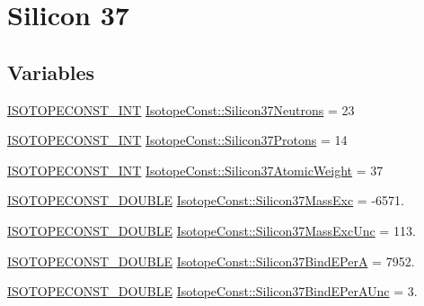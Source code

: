 \hypertarget{group___isotope_const-_silicon-_si37}{}\section{Silicon 37}
\label{group___isotope_const-_silicon-_si37}
\subsection*{Variables}
\begin{DoxyCompactItemize}
\item 
\mbox{\hyperlink{group___isotope_const-_macros_ga5f18360b3e99483a35c32d789e62621c}{I\+S\+O\+T\+O\+P\+E\+C\+O\+N\+S\+T\+\_\+\+I\+NT}} \mbox{\hyperlink{group___isotope_const-_silicon-_si37_gae384b92e5328dbd0e4b34cd60500f507}{Isotope\+Const\+::\+Silicon37\+Neutrons}} = 23
\item 
\mbox{\hyperlink{group___isotope_const-_macros_ga5f18360b3e99483a35c32d789e62621c}{I\+S\+O\+T\+O\+P\+E\+C\+O\+N\+S\+T\+\_\+\+I\+NT}} \mbox{\hyperlink{group___isotope_const-_silicon-_si37_ga2416bdca2fa3dddcbc864745a2773ec3}{Isotope\+Const\+::\+Silicon37\+Protons}} = 14
\item 
\mbox{\hyperlink{group___isotope_const-_macros_ga5f18360b3e99483a35c32d789e62621c}{I\+S\+O\+T\+O\+P\+E\+C\+O\+N\+S\+T\+\_\+\+I\+NT}} \mbox{\hyperlink{group___isotope_const-_silicon-_si37_ga1fb0ed182f69b8a6fbfccf304afa9d38}{Isotope\+Const\+::\+Silicon37\+Atomic\+Weight}} = 37
\item 
\mbox{\hyperlink{group___isotope_const-_macros_ga8f45a7272ce02c0b4c65c44636ed719a}{I\+S\+O\+T\+O\+P\+E\+C\+O\+N\+S\+T\+\_\+\+D\+O\+U\+B\+LE}} \mbox{\hyperlink{group___isotope_const-_silicon-_si37_ga9b170c2e9742ba063a2a5ab42919bc8b}{Isotope\+Const\+::\+Silicon37\+Mass\+Exc}} = -\/6571.
\item 
\mbox{\hyperlink{group___isotope_const-_macros_ga8f45a7272ce02c0b4c65c44636ed719a}{I\+S\+O\+T\+O\+P\+E\+C\+O\+N\+S\+T\+\_\+\+D\+O\+U\+B\+LE}} \mbox{\hyperlink{group___isotope_const-_silicon-_si37_ga139a6b83ace61048695079a99c695b92}{Isotope\+Const\+::\+Silicon37\+Mass\+Exc\+Unc}} = 113.
\item 
\mbox{\hyperlink{group___isotope_const-_macros_ga8f45a7272ce02c0b4c65c44636ed719a}{I\+S\+O\+T\+O\+P\+E\+C\+O\+N\+S\+T\+\_\+\+D\+O\+U\+B\+LE}} \mbox{\hyperlink{group___isotope_const-_silicon-_si37_ga470f3898c28f4572a290149f734b4290}{Isotope\+Const\+::\+Silicon37\+Bind\+E\+PerA}} = 7952.
\item 
\mbox{\hyperlink{group___isotope_const-_macros_ga8f45a7272ce02c0b4c65c44636ed719a}{I\+S\+O\+T\+O\+P\+E\+C\+O\+N\+S\+T\+\_\+\+D\+O\+U\+B\+LE}} \mbox{\hyperlink{group___isotope_const-_silicon-_si37_ga7ba584627ac84273ca8ce7412207b3e1}{Isotope\+Const\+::\+Silicon37\+Bind\+E\+Per\+A\+Unc}} = 3.

\end{DoxyCompactItemize}
